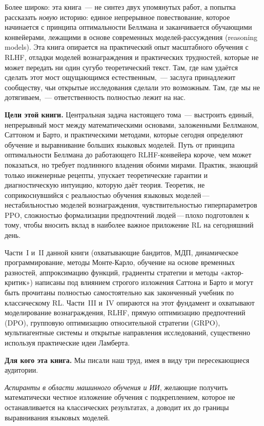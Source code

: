 Более широко: эта книга~--- не синтез двух упомянутых работ, а попытка рассказать \emph{новую} историю: единое непрерывное повествование, которое начинается с принципа оптимальности Беллмана и заканчивается обучающими конвейерами, лежащими в основе современных моделей-рассуждения (reasoning models). Эта книга опирается на практический опыт масштабного обучения с RLHF, отладки моделей вознаграждения и практических трудностей, которые не может передать ни один сугубо теоретический текст. Там, где нам удаётся сделать этот мост ощущающимся естественным,~--- заслуга принадлежит сообществу, чьи открытые исследования сделали это возможным. Там, где мы не дотягиваем,~--- ответственность полностью лежит на нас.


\medskip

\textbf{Цели этой книги.}\quad
Центральная задача настоящего тома~--- выстроить единый, непрерывный мост между математическими основами, заложенными Беллманом, Саттоном и Барто, и практическими методами, которые сегодня определяют обучение и выравнивание больших языковых моделей. Путь от принципа оптимальности Беллмана до работающего RLHF-конвейера короче, чем может показаться, но требует подлинного владения обоими мирами. Практик, знающий только инженерные рецепты, упускает теоретические гарантии и диагностическую интуицию, которую даёт теория. Теоретик, не соприкоснувшийся с реальностью обучения языковых моделей\,---\,нестабильностью моделей вознаграждения, чувствительностью гиперпараметров PPO, сложностью формализации предпочтений людей\,---\,плохо подготовлен к тому, чтобы вносить вклад в наиболее важное приложение RL на сегодняшний день.

Части~I и~II данной книги (охватывающие бандитов, МДП, динамическое программирование, методы Монте-Карло, обучение на основе временных разностей, аппроксимацию функций, градиенты стратегии и методы «актор-критик») написаны под влиянием строгого изложения Саттона и Барто и могут быть прочитаны полностью самостоятельно как законченный учебник по классическому RL. Части~III и~IV опираются на этот фундамент и охватывают моделирование вознаграждения, RLHF, прямую оптимизацию предпочтений (DPO), групповую оптимизацию относительной стратегии (GRPO), мультиагентные системы и открытые направления исследований, существенно используя практические идеи Ламберта.

\medskip

\textbf{Для кого эта книга.}\quad
Мы писали наш труд, имея в виду три пересекающиеся аудитории.

\emph{Аспиранты в области машинного обучения и ИИ}, желающие получить математически честное изложение обучения с подкреплением, которое не останавливается на классических результатах, а доводит их до границы выравнивания языковых моделей.

